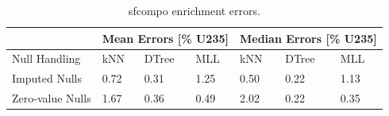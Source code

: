 \begin{table}[!ht]
  \centering
  \begin{tabular}{@{}l|lll|lll@{}}
  \toprule
                   & \multicolumn{3}{l|}{Mean Errors [\% U235]} & \multicolumn{3}{l}{Median Errors [\% U235]} \\ \toprule
  Null Handling    & kNN           & DTree          & MLL          & kNN            & DTree          & MLL    \\ \midrule
  Imputed Nulls    & 0.72          & 0.31           & 1.25         & 0.50           & 0.22           & 1.13   \\
  Zero-value Nulls & 1.67          & 0.36           & 0.49         & 2.02           & 0.22           & 0.35   \\ \bottomrule
  \end{tabular}
  \caption{sfcompo enrichment errors.}
  \label{tbl:sfcoenri}
\end{table}


